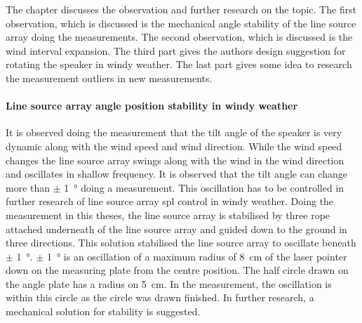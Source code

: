 The chapter discusses the observation and further research on the topic. The first observation, which is discussed is the mechanical angle stability of the line source array doing the measurements. The second observation, which is discussed is the wind interval expansion. The third part gives the authors design suggestion for rotating the speaker in windy weather. The last part gives some idea to research the measurement outliers in new measurements.


\paragraph{Line source array angle position stability in windy weather} 
It is observed doing the measurement that the tilt angle of the speaker is very dynamic along with the wind speed and wind direction. While the wind speed changes the line source array swings along with the wind in the wind direction and oscillates in shallow frequency. It is observed that the tilt angle can change more than $\pm$ \SI{1}{\degree} doing a measurement. This oscillation has to be controlled in further research of line source array \gls{spl} control in windy weather. Doing the measurement in this theses, the line source array is stabilised by three rope attached underneath of the line source array and guided down to the ground in three directions. This solution stabilised the line source array to oscillate beneath  $\pm$ \SI{1}{\degree}. $\pm$ \SI{1}{\degree} is an oscillation of a maximum radius of \SI{8}{\centi\meter} of the laser pointer down on the measuring plate from the centre position. The half circle drawn on the angle plate has a radius on \SI{5}{\centi\meter}. In the measurement, the oscillation is within this circle as the circle was drawn finished. In further research, a mechanical solution for stability is suggested. 



